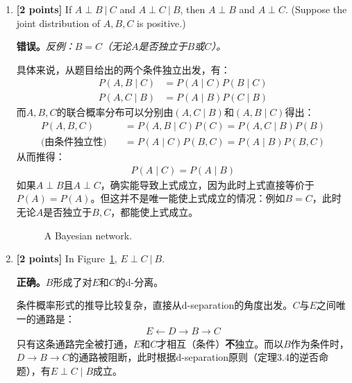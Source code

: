 \documentclass[12pt]{article}
\begin{document}
\begin{enumerate}

	\item \textbf{[2 points]} If $ A \perp B \ | \ C $ and $ A \perp C \ | \ B $, then $ A \perp B $ and $ A \perp C $.
	      (Suppose the joint distribution of $ A, B, C $ is positive.)

	      \begin{solution}
		      \textbf{错误。}\textit{反例：$B = C$（无论$A$是否独立于$B$或$C$）。}

		      具体来说，从题目给出的两个条件独立出发，有：
		      \begin{align*}
			      P(A,B \mid C) & = P(A \mid C) P(B \mid C) \\
			      P(A,C \mid B) & = P(A \mid B) P(C\mid B)
		      \end{align*}
		      而$A,B,C$的联合概率分布可以分别由$(A,C \mid B)$和$(A,B\mid C)$得出：
		      \begin{align*}
			      P(A,B,C)             & = P(A,B \mid C) P(C) = P(A,C \mid B) P(B) \\
			      \text{(由条件独立性)}\quad & = P(A\mid C)P(B,C) = P(A\mid B) P(B,C)
		      \end{align*}
		      从而推得：
		      \begin{align*}
			      P(A\mid C)=P(A \mid B)
		      \end{align*}
		      如果$A \perp B$且$A \perp C$，确实能导致上式成立，因为此时上式直接等价于$P(A) =P(A)$。但这并不是唯一能使上式成立的情况：例如$B = C$，此时无论$A$是否独立于$B,C$，都能使上式成立。
	      \end{solution}


	      \begin{figure}[h]
		      \centering
		      \caption{A Bayesian network.}
		      \label{fig:y-bayesnet}
	      \end{figure}


	\item \textbf{[2 points]} In Figure~\ref{fig:y-bayesnet}, $ E \perp C \ | \ B $.

	      \begin{solution}
		      \textbf{正确。}$B$形成了对$E$和$C$的d-分离。

		      条件概率形式的推导比较复杂，直接从d-separation的角度出发。$C$与$E$之间唯一的通路是：
		      \begin{align*}
			      E \leftarrow D \rightarrow B \rightarrow C
		      \end{align*}
		      只有这条通路完全被打通，$E$和$C$才相互（条件）\textbf{不}独立。而以$B$作为条件时，$D \rightarrow B \rightarrow C$的通路被阻断，此时根据d-separation原则（定理3.4的逆否命题），有$E \perp C \mid B$成立。
	      \end{solution}


\end{enumerate}
\end{document}
